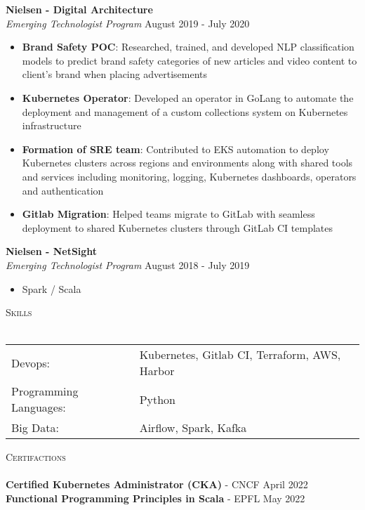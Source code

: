 \documentclass[a4paper]{article}
\newcommand{\lineunder} {
    \vspace*{-8pt} \\
    \hspace*{-18pt} \hrulefill \\
}
\newcommand{\header} [1] {
    {\hspace*{-18pt}\vspace*{6pt} \textsc{#1}}
    \vspace*{-6pt} \lineunder
}
\begin{document}
\textbf{Nielsen - Digital Architecture}\\
\textit{Emerging Technologist Program} \hfill August 2019 - July 2020\\
\vspace{-1mm}
\begin{itemize} \itemsep 1pt
	\item \textbf{Brand Safety POC}: Researched, trained, and developed NLP classification models to predict brand safety categories of new articles and video content to client's brand when placing advertisements
    \item \textbf{Kubernetes Operator}: Developed an operator in GoLang to automate the deployment and management of a custom collections system on Kubernetes infrastructure
    \item \textbf{Formation of SRE team}: Contributed to EKS automation to deploy Kubernetes clusters across regions and environments along with shared tools and services including monitoring, logging, Kubernetes dashboards, operators and authentication
    \item \textbf{Gitlab Migration}: Helped teams migrate to GitLab with seamless deployment to shared Kubernetes clusters through GitLab CI templates
\end{itemize}

\textbf{Nielsen - NetSight}\\
\textit{Emerging Technologist Program} \hfill August 2018 - July 2019\\
\vspace{-1mm}
\begin{itemize} \itemsep 1pt
	\item Spark / Scala
\end{itemize}

\header{Skills}
\begin{tabular}{ l l }
	Devops:                & Kubernetes, Gitlab CI, Terraform, AWS, Harbor \\
	Programming Languages: & Python                                        \\
	Big Data:              & Airflow, Spark, Kafka                         \\
\end{tabular}
\vspace{3mm}



\header{Certifactions}
\textbf{Certified Kubernetes Administrator (CKA)} - CNCF \hfill April 2022\\
\vspace*{1mm}
\textbf{Functional Programming Principles in Scala} - EPFL \hfill May 2022\\
\vspace*{1mm}

\ 
\end{document}
